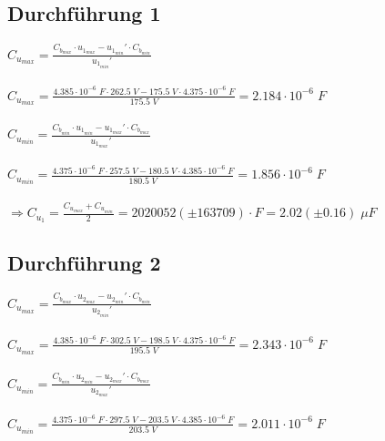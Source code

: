 \documentclass[a4paper,12pt]{article}
\begin{document}
\subsection{Durchführung 1}

$C_{u_{max}} = \displaystyle{\frac{C_{b_{max}}\cdot u_{1_{max}}-u_{1_{min}}'\cdot C_{b_{min}}}{u_{1_{min}}'}}$\\\\

$C_{u_{max}} = \displaystyle{\frac{4.385\cdot 10^{-6}\;F\cdot 262.5\;V-175.5\;V\cdot 4.375\cdot 10^{-6}\;F}{175.5\;V}} = 2.184\cdot 10^{-6}\;F$\\\\

$C_{u_{min}} = \displaystyle{\frac{C_{b_{min}}\cdot u_{1_{min}}-u_{1_{max}}'\cdot C_{b_{max}}}{u_{1_{max}}'}}$\\\\

$C_{u_{min}} = \displaystyle{\frac{4.375\cdot 10^{-6}\;F\cdot 257.5\;V-180.5\;V\cdot 4.385\cdot 10^{-6}\;F}{180.5\;V}} = 1.856\cdot 10^{-6}\;F$\\\\

$\Rightarrow C_{u_1}=\displaystyle{\frac{C_{u_{max}}+C_{u_{min}}}{2}} = 2020052 (\pm 163709)\cdot F = 2.02 (\pm 0.16)\; \mu F$

\subsection{Durchführung 2}

$C_{u_{max}} = \displaystyle{\frac{C_{b_{max}}\cdot u_{2_{max}}-u_{2_{min}}'\cdot C_{b_{min}}}{u_{2_{min}}'}}$\\\\

$C_{u_{max}} = \displaystyle{\frac{4.385\cdot 10^{-6}\;F\cdot 302.5\;V-198.5\;V\cdot 4.375\cdot 10^{-6}\;F}{195.5\;V}} = 2.343\cdot 10^{-6}\;F$\\\\

$C_{u_{min}} = \displaystyle{\frac{C_{b_{min}}\cdot u_{2_{min}}-u_{2_{max}}'\cdot C_{b_{max}}}{u_{2_{max}}'}}$\\\\

$C_{u_{min}} = \displaystyle{\frac{4.375\cdot 10^{-6}\;F\cdot 297.5\;V-203.5\;V\cdot 4.385\cdot 10^{-6}\;F}{203.5\;V}} = 2.011\cdot 10^{-6}\; F$\\\\
\end{document}
